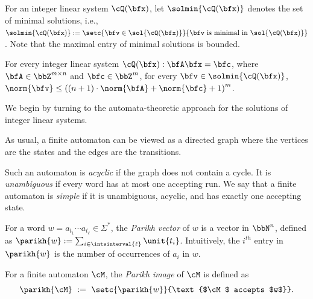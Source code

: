 For an integer linear system $\cQ(\bfx)$,
let $\solmin{\cQ(\bfx)}$ denotes the set of minimal solutions,
i.e., $\solmin{\cQ(\bfx)} := \setc{\bfv \in \sol{\cQ(\bfx)}}{\bfv\ \text{is minimal in}\ \sol{\cQ(\bfx)}}$.
Note that the maximal entry of minimal solutions is bounded.

\begin{lemma}\label{lem:minimal}
    For every integer linear system $\cQ(\bfx): \bfA \bfx = \bfc$,
    where $\bfA \in \bbZ^{m \times n}$ and $\bfc \in \bbZ^{m}$,
    for every $\bfv \in \solmin{\cQ(\bfx)}$,
     $\norm{\bfv} \le \left((n+1)\cdot\norm{\bfA} + \norm{\bfc} + 1\right)^{m}$.
\end{lemma}

We begin by turning to the automata-theoretic approach for the solutions of integer linear systems.

\begin{definition} \label{def:simpleplus}
As usual, a finite automaton can be viewed as a 
directed graph where the vertices are the states
and the edges are the transitions.

Such an automaton is \emph{acyclic} if the graph does not contain a cycle. 
It is \emph{unambiguous} if every word has 
at most one accepting run.
    We say that a finite automaton is \emph{simple}
    if it is unambiguous, acyclic, and has exactly one accepting state.
\end{definition}

\begin{definition}
    For a word $w = a_{t_1}\cdots a_{t_\ell} \in \Sigma^*$,
    the \emph{Parikh vector} of $w$
    is a vector in $\bbN^{n}$, defined as
    $\parikh{w} := \sum_{i \in \intsinterval{\ell}} \unit{t_i}$.
    Intuitively, the $i^{th}$ entry in $\parikh{w}$ is the number of occurrences of $a_i$ in $w$.

For a finite automaton $\cM$, the \emph{Parikh image} of $\cM$ is defined as
\begin{equation*}
\parikh{\cM}
\ :=\ 
\setc{\parikh{w}}{\text{$\cM$ accepts $w$}}.
\end{equation*}
\end{definition}

